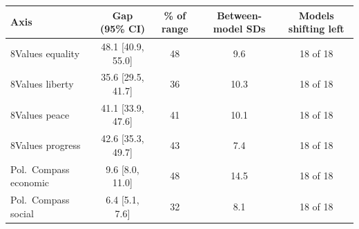 \begin{tabular}{lcccc}
\toprule
Axis & Gap (95\% CI) & \% of range & Between-model SDs & Models shifting left \\
\midrule
8Values equality & 48.1 [40.9, 55.0] & 48 & 9.6 & 18 of 18 \\
8Values liberty & 35.6 [29.5, 41.7] & 36 & 10.3 & 18 of 18 \\
8Values peace & 41.1 [33.9, 47.6] & 41 & 10.1 & 18 of 18 \\
8Values progress & 42.6 [35.3, 49.7] & 43 & 7.4 & 18 of 18 \\
Pol.\ Compass economic & 9.6 [8.0, 11.0] & 48 & 14.5 & 18 of 18 \\
Pol.\ Compass social & 6.4 [5.1, 7.6] & 32 & 8.1 & 18 of 18 \\
\bottomrule
\end{tabular}
